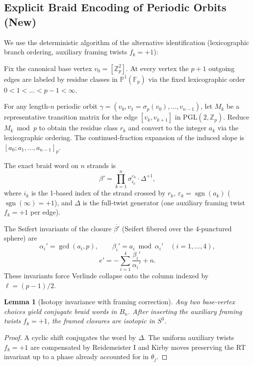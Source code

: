 \documentclass[11pt,a4paper]{amsart}
\newtheorem{lemma}[theorem]{Lemma}
\begin{document}
\subsection{Explicit Braid Encoding of Periodic Orbits (New)}
\label{subsec:braid-encoding}

We use the deterministic algorithm of the alternative identification (lexicographic branch ordering, auxiliary framing twists \(f_k=+1\)):

Fix the canonical base vertex \(v_0=[\mathbb{Z}_p^2]\). At every vertex the \(p+1\) outgoing edges are labeled by residue classes in \(\mathbb{P}^1(\mathbb{F}_p)\) via the fixed lexicographic order \(0<1<\dots<p-1<\infty\).

For any length-\(n\) periodic orbit \(\gamma=(v_0,v_1=\sigma_p(v_0),\dots,v_{n-1})\), let \(M_k\) be a representative transition matrix for the edge \([v_k,v_{k+1}]\) in \(\mathrm{PGL}(2,\mathbb{Z}_p)\). Reduce \(M_k\bmod p\) to obtain the residue class \(r_k\) and convert to the integer \(a_k\) via the lexicographic ordering. The continued-fraction expansion of the induced slope is \([a_0;a_1,\dots,a_{n-1}]_p\).

The exact braid word on \(n\) strands is
\[
\beta'=\prod_{k=1}^n\sigma_{i_k}^{\varepsilon_k}\cdot\Delta^{+1},
\]
where \(i_k\) is the 1-based index of the strand crossed by \(r_k\), \(\varepsilon_k=\operatorname{sgn}(a_k)\) (\(\operatorname{sgn}(\infty)=+1\)), and \(\Delta\) is the full-twist generator (one auxiliary framing twist \(f_k=+1\) per edge).

The Seifert invariants of the closure \(\overline{\beta'}\) (Seifert fibered over the 4-punctured sphere) are
\[
\alpha_i'=\gcd(a_i,p),\qquad\beta_i'=a_i\bmod\alpha_i'\quad(i=1,\dots,4),
\]
\[
e'=-\sum_{i=1}^4\frac{\beta_i'}{\alpha_i'}+n.
\]
These invariants force Verlinde collapse onto the column indexed by \(\ell=(p-1)/2\).

\begin{lemma}[Isotopy invariance with framing correction]
Any two base-vertex choices yield conjugate braid words in \(B_n\). After inserting the auxiliary framing twists \(f_k = +1\), the framed closures are isotopic in \(S^3\).
\end{lemma}

\begin{proof}
A cyclic shift conjugates the word by \(\Delta\). The uniform auxiliary twists \(f_k=+1\) are compensated by Reidemeister I and Kirby moves preserving the RT invariant up to a phase already accounted for in \(\theta_j\).
\end{proof}
\end{document}
